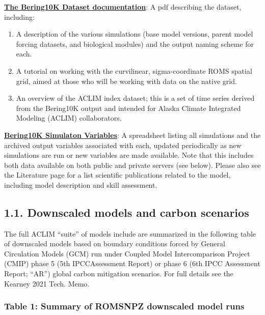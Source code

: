 \documentclass[
]{article}
\begin{document}
\href{https://drive.google.com/file/d/1GlITTIvbs2gRBMNIxdDI15cZU6mH4ckg/view}{\textbf{The
Bering10K Dataset documentation}}: A pdf describing the dataset,
including:

\begin{enumerate}
\def\labelenumi{\arabic{enumi}.}
\item
  A description of the various simulations (base model versions, parent
  model forcing datasets, and biological modules) and the output naming
  scheme for each.
\item
  A tutorial on working with the curvilinear, sigma-coordinate ROMS
  spatial grid, aimed at those who will be working with data on the
  native grid.
\item
  An overview of the ACLIM index dataset; this is a set of time series
  derived from the Bering10K output and intended for Alaska Climate
  Integrated Modeling (ACLIM) collaborators.
\end{enumerate}

\href{https://drive.google.com/file/d/1C1FCxRMBm0uBv2wEKwrGfHmLnjt_gFvG/view}{\textbf{Bering10K
Simulaton Variables}}: A spreadsheet listing all simulations and the
archived output variables associated with each, updated periodically as
new simulations are run or new variables are made available. Note that
this includes both data available on both public and private servers
(see below). Please also see the Literature page for a list scientific
publications related to the model, including model description and skill
assessment.

\hypertarget{downscaled-models-and-carbon-scenarios}{%
\subsection{1.1. Downscaled models and carbon
scenarios}\label{downscaled-models-and-carbon-scenarios}}

The full ACLIM ``suite'' of models include are summarized in the
following table of downscaled models based on boundary conditions forced
by General Circulation Models (GCM) run under Coupled Model
Intercomparison Project (CMIP) phase 5 (5th IPCCAssessment Report) or
phase 6 (6th IPCC Assessment Report; ``AR'') global carbon mitigation
scenarios. For full details see the Kearney 2021 Tech. Memo.

\hypertarget{table-1-summary-of-romsnpz-downscaled-model-runs}{%
\subsubsection{Table 1: Summary of ROMSNPZ downscaled model
runs}\label{table-1-summary-of-romsnpz-downscaled-model-runs}}
\end{document}
